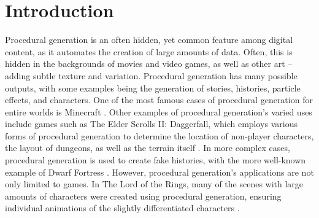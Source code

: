 \documentclass[10pt]{report}
\begin{document}
	\clearpage
	
	\tableofcontents
	
	\clearpage
	
	\let\clearpage\relax
	\chapter{Introduction}
		
		Procedural generation is an often hidden, yet common feature among digital content, as it automates the creation of large amounts of data. Often, this is hidden in the backgrounds of movies and video games, as well as other art -- adding subtle texture and variation. Procedural generation has many possible outputs, with some examples being the generation of stories, histories, particle effects, and characters. One of the most famous cases of procedural generation for entire worlds is Minecraft \cite{minecraft-gen}. Other examples of procedural generation's varied uses include games such as The Elder Scrolls II: Daggerfall, which employs various forms of procedural generation to determine the location of non-player characters, the layout of dungeons, as well as the terrain itself \cite{daggerfall}. In more complex cases, procedural generation is used to create fake histories, with the more well-known example of Dwarf Fortress \cite{df-dev}. However, procedural generation's applications are not only limited to games. In The Lord of the Rings, many of the scenes with large amounts of characters were created using procedural generation, ensuring individual animations of the slightly differentiated characters \cite{massive}.
		
\end{document}
